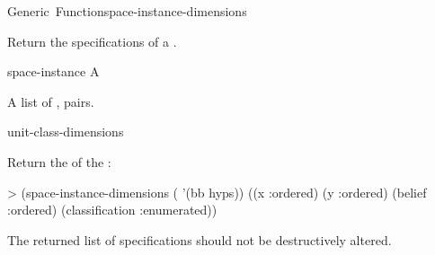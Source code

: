 \documentclass[10pt,twoside,english,pdftex]{article}
\begin{document}
\begin{functiondoc}{Generic~Function}{space-instance-dimensions}%
  {
    \returns{} }
%
%

\fnsyntax

\fnpurpose Return the  specifications of a
.

\fnmethods
{}%
  {\code{(} 
    \returns{} }

\fnpackage {}

\fnmodule {}

\fnargs
\begin{args}{space-instance}
 A 
\end{args}

\fnreturns A list of ,  pairs.

\begin{alsos}{unit-class-dimensions}
\end{alsos}

\fnexample
{}%
Return the  of the  :
\begin{example}
> (space-instance-dimensions ( '(bb hyps))
((x :ordered) (y :ordered) (belief :ordered) (classification :enumerated))
\end{example}

\fnnotes The returned list of  specifications should not be
destructively altered.

\end{functiondoc}

\end{document}

